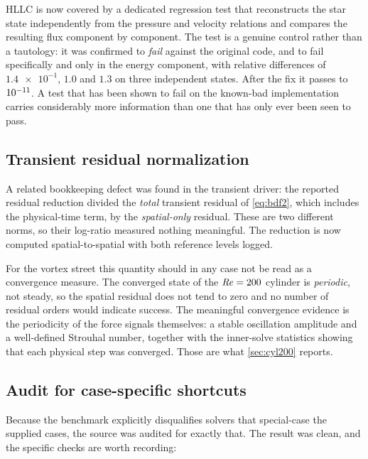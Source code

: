 HLLC is now covered by a dedicated regression test that reconstructs the star
state independently from the pressure and velocity relations and compares the
resulting flux component by component. The test is a genuine control rather than a
tautology: it was confirmed to \emph{fail} against the original code, and to fail
specifically and only in the energy component, with relative differences of
$\num{1.4e-1}$, $\num{1.0}$ and $\num{1.3}$ on three independent states. After the
fix it passes to $10^{-11}$. A test that has been shown to fail on the
known-bad implementation carries considerably more information than one that has
only ever been seen to pass.

\subsection{Transient residual normalization}
\label{sec:transientnorm}

A related bookkeeping defect was found in the transient driver: the reported
residual reduction divided the \emph{total} transient residual of
\cref{eq:bdf2}, which includes the physical-time term, by the \emph{spatial-only}
residual. These are two different norms, so their log-ratio measured nothing
meaningful. The reduction is now computed spatial-to-spatial with both reference
levels logged.

For the vortex street this quantity should in any case not be read as a
convergence measure. The converged state of the $\mathit{Re}=200$ cylinder is
\emph{periodic}, not steady, so the spatial residual does not tend to zero and no
number of residual orders would indicate success. The meaningful convergence
evidence is the periodicity of the force signals themselves: a stable oscillation
amplitude and a well-defined Strouhal number, together with the inner-solve
statistics showing that each physical step was converged. Those are what
\cref{sec:cyl200} reports.

\subsection{Audit for case-specific shortcuts}
\label{sec:shortcuts}

Because the benchmark explicitly disqualifies solvers that special-case the
supplied cases, the source was audited for exactly that. The result was clean, and
the specific checks are worth recording:


